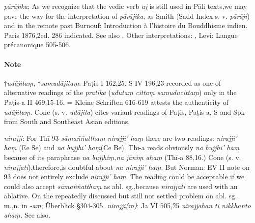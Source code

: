 \documentclass[11pt]{article}
\newcommand*\ṛ{r\symbol{"325}}
\newcommand*\Ṛ{R\symbol{"325}}
\newcommand*\ṝ{r\symbol{"304}\symbol{"325}}
\newcommand*\Ṝ{R\symbol{"304}\symbol{"325}}
\newcommand*\ḷ{l\symbol{"325}}
\newcommand*\ḹ{l\symbol{"304}\symbol{"325}}
\newcommand*\Ḷ{L\symbol{"325}}
\newcommand*\Ḹ{L\symbol{"304}\symbol{"325}}
\begin{document}
\begin{description}[leftmargin=\parindent]
\begin{description}[leftmargin=\parindent]
\item[derivative]
\item[parā-aj] \textit{pārājika}:
As we recognize that the vedic verb \textit{aj} is still used in Pāli texts,we may pave the way for the interpretation of \textit{pārājika},
as Smith (Sadd Index s. v. \textit{pārāji}) and in the remote past Burnouf: Introduction à l'histoire du Bouddhisme indien. Paris 1876,2ed. 286 indicated.
See also \citet[62 with fn.14]{vonhinueber:1985}.
Other interpretations: \citet[341-342]{roth:1968},
Levi: Langue précanonique 505-506.

\end{description}
\end{description}

\paragraph*{Note}
†\textit{udājitaṃ}, †\textit{samudājitaṃ}: Paṭis I 162,25. S IV 196,23
recorded as one of alternative readings of the \textit{pratīka}
(\textit{udutaṃ cittaṃ samuducittaṃ}) only in the Paṭis-a II 469,15-16.
\citet{vonhinuber:1979} = Kleine Schriften 616-619 attests the authenticity of \textit{udājitaṃ}.
Cone (s. v. \textit{udājita}) cites variant readings of Paṭis, Paṭis-a, S and Spk from South and Southeast Asian editions.
	
\textit{nirajji}:  For Thī 93 \textit{sāmaññatthaṃ nirajji' haṃ} there are two readings: \textit{nirajji' haṃ} (Ee Se) and \textit{na bujjhi' haṃ}(Ce Be).
Thī-a reads obviously \textit{na bujjhi' haṃ} because of its paraphrase \textit{na bujjhiṃ,na jāniṃ ahaṃ} (Thī-a 88,16.)
Cone (s. v. \textit{nirajjati}),therefore,is doubtful about \textit{na nirajji' haṃ}.
But Norman: EV II note on 93 does not entirely exclude \textit{nirajji' haṃ}.
The reading could be acceptable if we could also accept \textit{sāmaññatthaṃ} as abl. sg.,because \textit{nirajjati} are used with an ablative.
On the repeatedly discussed but still not settled problem on abl. sg. m.,n. in \textit{-aṃ}; Überblick §304-305.
\textit{nirajji(ṃ)}: Ja VI 505,25 \textit{nirajjahan ti nikkhanto ahaṃ.} See also\citet[169]{Smith:1932}.
\end{document}
